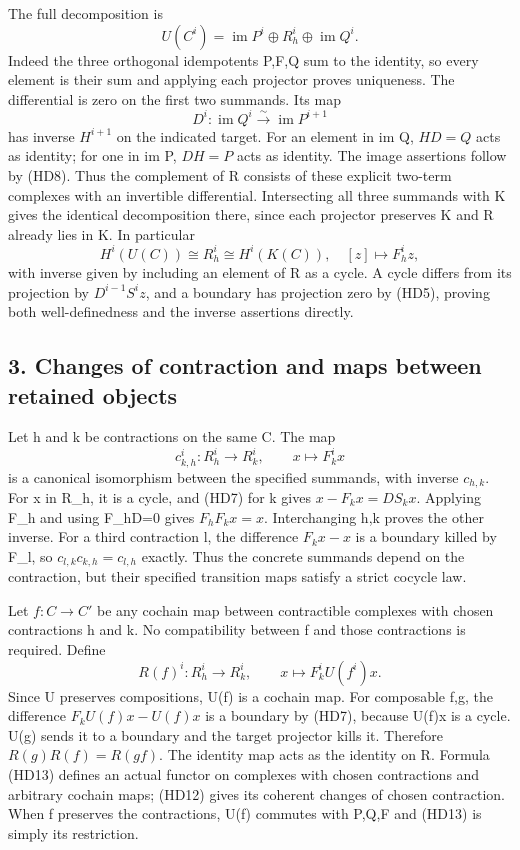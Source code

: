 \documentclass[
]{article}
\begin{document}
The full decomposition is \[
U(C^i)=\operatorname{im}P^i\oplus R_h^i\oplus\operatorname{im}Q^i.
\tag{HD9}
\] Indeed the three orthogonal idempotents P,F,Q sum to the identity, so
every element is their sum and applying each projector proves
uniqueness. The differential is zero on the first two summands. Its map
\[
D^i:\operatorname{im}Q^i\xrightarrow{\sim}\operatorname{im}P^{i+1}
\tag{HD10}
\] has inverse \(H^{i+1}\) on the indicated target. For an element in im
Q, \(HD=Q\) acts as identity; for one in im P, \(DH=P\) acts as
identity. The image assertions follow by (HD8). Thus the complement of R
consists of these explicit two-term complexes with an invertible
differential. Intersecting all three summands with K gives the identical
decomposition there, since each projector preserves K and R already lies
in K. In particular \[
H^i(U(C))\cong R_h^i\cong H^i(K(C)),
\quad [z]\longmapsto F_h^iz,
\tag{HD11}
\] with inverse given by including an element of R as a cycle. A cycle
differs from its projection by \(D^{i-1}S^iz\), and a boundary has
projection zero by (HD5), proving both well-definedness and the inverse
assertions directly.

\subsection{3. Changes of contraction and maps between retained
objects}\label{changes-of-contraction-and-maps-between-retained-objects}

Let h and k be contractions on the same C. The map \[
c_{k,h}^i:R_h^i\to R_k^i,\qquad x\longmapsto F_k^ix
\tag{HD12}
\] is a canonical isomorphism between the specified summands, with
inverse \(c_{h,k}\). For x in R\_h, it is a cycle, and (HD7) for k gives
\(x-F_kx=DS_kx\). Applying F\_h and using F\_hD=0 gives \(F_hF_kx=x\).
Interchanging h,k proves the other inverse. For a third contraction l,
the difference \(F_kx-x\) is a boundary killed by F\_l, so
\(c_{l,k}c_{k,h}=c_{l,h}\) exactly. Thus the concrete summands depend on
the contraction, but their specified transition maps satisfy a strict
cocycle law.

Let \(f:C\to C'\) be any cochain map between contractible complexes with
chosen contractions h and k. No compatibility between f and those
contractions is required. Define \[
R(f)^i:R_h^i\to R_k^i,
\qquad x\longmapsto F_k^iU(f^i)x.
\tag{HD13}
\] Since U preserves compositions, U(f) is a cochain map. For composable
f,g, the difference \(F_kU(f)x-U(f)x\) is a boundary by (HD7), because
U(f)x is a cycle. U(g) sends it to a boundary and the target projector
kills it. Therefore \(R(g)R(f)=R(gf)\). The identity map acts as the
identity on R. Formula (HD13) defines an actual functor on complexes
with chosen contractions and arbitrary cochain maps; (HD12) gives its
coherent changes of chosen contraction. When f preserves the
contractions, U(f) commutes with P,Q,F and (HD13) is simply its
restriction.
\end{document}
